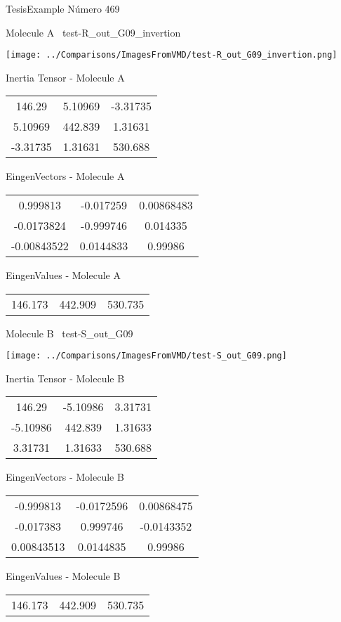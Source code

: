 \vtab[-3cm]
\begin{center}
{\large TesisExample \tab Número 469}
\end{center}
\begin{multicols}{2}
\begin{center}

Molecule A \
test-R\_out\_G09\_invertion

\texttt{[image: ../Comparisons/ImagesFromVMD/test-R\_out\_G09\_invertion.png]}

Inertia Tensor - Molecule A \\
\begin{tabular}{|c c c|}
146.29	 & 	5.10969	 & 	-3.31735	 \\
5.10969	 & 	442.839	 & 	1.31631	 \\
-3.31735	 & 	1.31631	 & 	530.688
\end{tabular}

\vtab
 EingenVectors - Molecule A     \\
\begin{tabular}{|c c c|}
0.999813	 & 	-0.017259	 & 	0.00868483	 \\
-0.0173824	 & 	-0.999746	 & 	0.014335	 \\
-0.00843522	 & 	0.0144833	 & 	0.99986
\end{tabular}

\vtab
 EingenValues - Molecule A     \\
\begin{tabular}{|c c c|}
146.173	 & 	442.909	 & 	530.735	 \\
\end{tabular}
\columnbreak

Molecule B \
test-S\_out\_G09

\texttt{[image: ../Comparisons/ImagesFromVMD/test-S\_out\_G09.png]}

Inertia Tensor - Molecule B \\
\begin{tabular}{|c c c|}
146.29	 & 	-5.10986	 & 	3.31731	 \\
-5.10986	 & 	442.839	 & 	1.31633	 \\
3.31731	 & 	1.31633	 & 	530.688
\end{tabular}

\vtab
 EingenVectors - Molecule B     \\
\begin{tabular}{|c c c|}
-0.999813	 & 	-0.0172596	 & 	0.00868475	 \\
-0.017383	 & 	0.999746	 & 	-0.0143352	 \\
0.00843513	 & 	0.0144835	 & 	0.99986
\end{tabular}

\vtab
 EingenValues - Molecule B     \\
\begin{tabular}{|c c c|}
146.173	 & 	442.909	 & 	530.735	 \\
\end{tabular}

\end{center}
\end{multicols}

